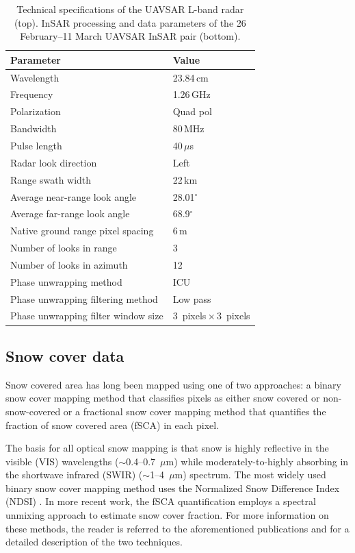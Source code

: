 \begin{table}[t]
\centering
\label{tab:uavsar_specs}
\caption{Technical specifications of the UAVSAR L-band radar (top). InSAR processing and data parameters of the 26 February--11 March UAVSAR InSAR pair (bottom).}
\begin{tabular}{ll}
\toprule Parameter & Value \\
\midrule
Wavelength & 23.84\,cm \\
Frequency & 1.26\,GHz \\
Polarization & Quad pol \\
Bandwidth & 80\,MHz \\
Pulse length & 40\,$\mu$s \\
Radar look direction & Left \\
Range swath width & 22\,km \\
Average near-range look angle & 28.01$^{\circ}$\\
Average far-range look angle & 68.9$^{\circ}$\\
\midrule
Native ground range pixel spacing & 6\,m \\
Number of looks in range & 3 \\
Number of looks in azimuth & 12 \\
Phase unwrapping method & ICU \\
Phase unwrapping filtering method & Low pass \\
Phase unwrapping filter window size & 3~pixels\,$\times$\,3~pixels \\
\bottomrule
\end{tabular}
\end{table}


\hypertarget{ch4-methods-2}{\subsection{Snow cover data}\label{ch4-methods-2}}

Snow covered area has long been mapped using one of two approaches: a binary snow cover mapping method that classifies pixels as either snow covered or non-snow-covered or a fractional snow cover mapping method that quantifies the fraction of snow covered area (fSCA) in each pixel. 

The basis for all optical snow mapping is that snow is highly reflective in the visible (VIS) wavelengths ($\sim$0.4--0.7~$\mu$m) while moderately-to-highly absorbing in the shortwave infrared (SWIR) ($\sim$1--4~$\mu$m) spectrum. The most widely used binary snow cover mapping method uses the Normalized Snow Difference Index (NDSI) \citep{dozierSpectralSignatureAlpine1989}. In more recent work, the fSCA quantification employs a spectral unmixing approach \citep{nolinMappingAlpineSnow1993,rosenthalAutomatedMappingMontane1996} to estimate snow cover fraction. For more information on these methods, the reader is referred to the aforementioned publications and \cite{stillingerLandsatMODISVIIRS2023} for a detailed description of the two techniques.

